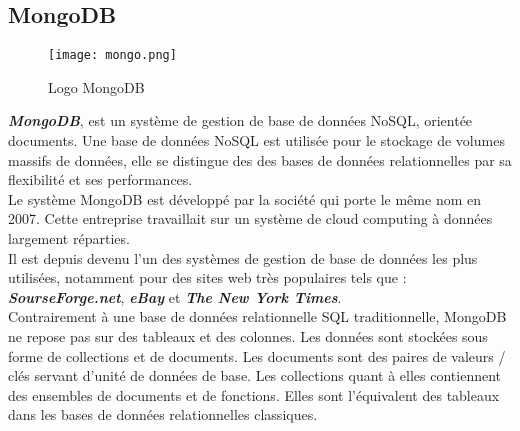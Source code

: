 \subsection{MongoDB}
\vspace{1cm}
\begin{figure}[H]
    \centering
    \texttt{[image: mongo.png]}
    \vspace{.5cm}
    \caption{Logo MongoDB}
    \label{fig:mongo_logo}
\end{figure}
\textit{\textbf{MongoDB}}, est un système de gestion de base de données NoSQL, orientée documents. Une base de données NoSQL est utilisée pour le stockage de volumes massifs de données, elle se distingue des des bases de données relationnelles par sa flexibilité et ses performances.\\
\noindent Le système MongoDB est développé par la société qui porte le même nom en 2007. Cette entreprise travaillait sur un système de cloud computing à données largement réparties.\\
\noindent Il est depuis devenu l'un des systèmes de gestion de base de données les plus utilisées, notamment pour des sites web très populaires tels que : \textit{\textbf{SourseForge.net}}, \textit{\textbf{eBay}} et \textit{\textbf{The New York Times}}.\\
\noindent Contrairement à une base de données relationnelle SQL traditionnelle, MongoDB ne repose pas sur des tableaux et des colonnes. Les données sont stockées sous forme de collections et de documents.
Les documents sont des paires de valeurs / clés servant d'unité de données de base. Les collections quant à elles contiennent des ensembles de documents et de fonctions. Elles sont l'équivalent des tableaux dans les bases de données relationnelles classiques.
